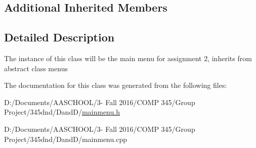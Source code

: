 \subsection*{Additional Inherited Members}


\subsection{Detailed Description}
The instance of this class will be the main menu for assignment 2, inherits from abstract class menus 

The documentation for this class was generated from the following files\+:\begin{DoxyCompactItemize}
\item 
D\+:/\+Documents/\+A\+A\+S\+C\+H\+O\+O\+L/3-\/ Fall 2016/\+C\+O\+M\+P 345/\+Group Project/345dnd/\+Dand\+D/\hyperlink{mainmenu_8h}{mainmenu.\+h}\item 
D\+:/\+Documents/\+A\+A\+S\+C\+H\+O\+O\+L/3-\/ Fall 2016/\+C\+O\+M\+P 345/\+Group Project/345dnd/\+Dand\+D/mainmenu.\+cpp\end{DoxyCompactItemize}
